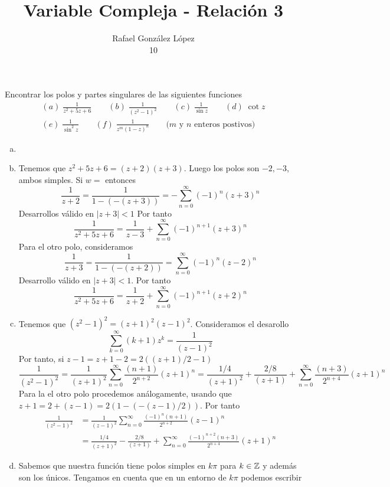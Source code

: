 \documentclass[twoside]{article}
\begin{document}
\title{Variable Compleja - Relación 3}
\author{Rafael González López\\
10}
\maketitle
\begin{ejercicio}{1}
Encontrar los polos y partes singulares de las siguientes funciones
\begin{gather*}
(a)\; \frac{1}{z^2+5z+6} \qquad (b)\; \frac{1}{(z^2-1)^2} \qquad (c)\; \frac{1}{\sin z} \qquad (d)\; \cot z\\
(e)\; \frac{1}{\sin^2 z}\qquad (f)\; \frac{1}{z^m(1-z)^n} \qquad\text{($m$ y $n$ enteros postivos)}
\end{gather*}
\end{ejercicio}
\begin{solucion}
\begin{enumerate}[(a)]
\item[]
\item Tenemos que $z^2+5z+6=(z+2)(z+3)$. Luego los polos son $-2,-3$, ambos simples. Si $w=$ entonces
$$
\frac{1}{z+2}=\frac{1}{1-(-(z+3))} = - \sum_{n=0}^\infty (-1)^n(z+3)^n
$$
Desarrollos válido en $|z+3|<1$ Por tanto
$$
\frac{1}{z^2+5z+6} = \frac{1}{z-3} + \sum_{n=0}^\infty (-1)^{n+1}(z+3)^n
$$
Para el otro polo, consideramos
$$
\frac{1}{z+3} = \frac{1}{1-(-(z+2))} = \sum_{n=0}^\infty (-1)^n(z-2)^n
$$
Desarrollo válido en $|z+3|<1$. Por tanto
$$
\frac{1}{z^2+5z+6} = \frac{1}{z+2} + \sum_{n=0}^\infty (-1)^{n+1}(z+2)^n
$$
\newpage
\item Tenemos que $(z^2-1)^2 = (z+1)^2(z-1)^2$. Consideramos el desarollo
$$
\sum_{k=0}^\infty (k+1)z^k = \frac{1}{(z-1)^2}
$$
Por tanto, si $z-1 = z+1 -2 = {2((z+1)/2-1)}$
$$\frac{1}{(z^2-1)^2}=  \frac{1}{(z+1)^2} \sum_{n=0}^\infty\frac{(n+1)}{2^{n+2}}(z+1)^n = \frac{1/4}{(z+1)^{2}}+\frac{2/8}{(z+1)} + \sum_{n=0}^\infty \frac{(n+3)}{2^{n+4}}(z+1)^{n} 
$$
Para la el otro polo procedemos análogamente, usando que $z+1=2+(z-1) = 2(1-(-(z-1)/2))$. Por tanto
\begin{align*}
\frac{1}{(z^2-1)^2}&=  \frac{1}{(z-1)^2} \sum_{n=0}^\infty\frac{(-1)^n(n+1)}{2^{n+2}}(z-1)^n\\
&= \frac{1/4}{(z+1)^{2}}-\frac{2/8}{(z+1)} + \sum_{n=0}^\infty \frac{(-1)^{n+2}(n+3)}{2^{n+4}}(z+1)^{n}
\end{align*}
\item Sabemos que nuestra función tiene polos simples en $k\pi$ para $k\in \mathbb{Z}$ y además son los únicos.
Tengamos en cuenta que en un entorno de $k\pi$ podemos escribir

\end{enumerate}
\end{solucion}
\end{document}
